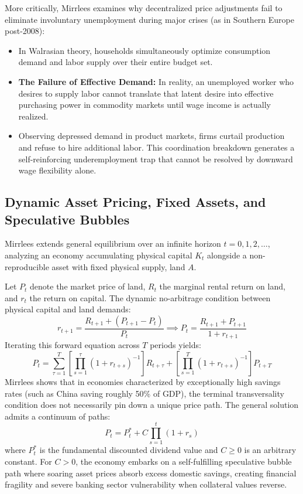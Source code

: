 \documentclass[11pt,a4paper]{article}
\begin{document}
More critically, Mirrlees examines why decentralized price adjustments fail to eliminate involuntary unemployment during major crises (as in Southern Europe post-2008):
\begin{itemize}
    \item In Walrasian theory, households simultaneously optimize consumption demand and labor supply over their entire budget set.
    \item \textbf{The Failure of Effective Demand:} In reality, an unemployed worker who desires to supply labor cannot translate that latent desire into effective purchasing power in commodity markets until wage income is actually realized.
    \item Observing depressed demand in product markets, firms curtail production and refuse to hire additional labor. This coordination breakdown generates a self-reinforcing underemployment trap that cannot be resolved by downward wage flexibility alone.
\end{itemize}

\subsection{Dynamic Asset Pricing, Fixed Assets, and Speculative Bubbles}
Mirrlees extends general equilibrium over an infinite horizon $t = 0, 1, 2, \dots$, analyzing an economy accumulating physical capital $K_t$ alongside a non-reproducible asset with fixed physical supply, land $A$.

Let $P_t$ denote the market price of land, $R_t$ the marginal rental return on land, and $r_t$ the return on capital. The dynamic no-arbitrage condition between physical capital and land demands:
\begin{equation}
r_{t+1} = \frac{R_{t+1} + (P_{t+1} - P_t)}{P_t} \implies P_t = \frac{R_{t+1} + P_{t+1}}{1 + r_{t+1}}
\end{equation}
Iterating this forward equation across $T$ periods yields:
\begin{equation}
P_t = \sum_{\tau=1}^T \left[ \prod_{s=1}^\tau (1 + r_{t+s})^{-1} \right] R_{t+\tau} + \left[ \prod_{s=1}^T (1 + r_{t+s})^{-1} \right] P_{t+T}
\end{equation}
Mirrlees shows that in economies characterized by exceptionally high savings rates (such as China saving roughly 50\% of GDP), the terminal transversality condition does not necessarily pin down a unique price path. The general solution admits a continuum of paths:
\begin{equation}
P_t = P_t^* + C \prod_{s=1}^t (1 + r_s)
\end{equation}
where $P_t^*$ is the fundamental discounted dividend value and $C \ge 0$ is an arbitrary constant. For $C > 0$, the economy embarks on a self-fulfilling speculative bubble path where soaring asset prices absorb excess domestic savings, creating financial fragility and severe banking sector vulnerability when collateral values reverse.
\end{document}
